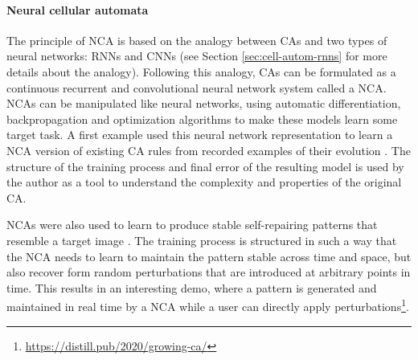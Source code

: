 \paragraph{Neural cellular automata\label{sec:neur-cell-autom}}
The principle of \ac{NCA} is based on the analogy between \acp{CA} and two types
of neural networks: \acp{RNN} and \acp{CNN} (see Section
\ref{sec:cell-autom-rnns} for more details about the analogy). Following this
analogy, \acp{CA} can be formulated as a continuous recurrent and convolutional
neural network system called a \ac{NCA}. \acp{NCA} can be manipulated like
neural networks, using automatic differentiation, backpropagation and
optimization algorithms to make these models learn some target task. A first
example used this neural network representation to learn a \ac{NCA} version of
existing \ac{CA} rules from recorded examples of their evolution
\parencite{gilpinCellularAutomataConvolutional2018}. The structure of the
training process and final error of the resulting model is used by the author as
a tool to understand the complexity and properties of the original \ac{CA}.

\acp{NCA} were also used to learn to produce stable self-repairing patterns that
resemble a target image \parencite{mordvintsevGrowingNeuralCellular2020}. The
training process is structured in such a way that the \ac{NCA} needs to learn to
maintain the pattern stable across time and space, but also recover form random
perturbations that are introduced at arbitrary points in time. This results in
an interesting demo, where a pattern is generated and maintained in real time by
a \ac{NCA} while a user can directly apply
perturbations\footnote{\url{https://distill.pub/2020/growing-ca/}}.

